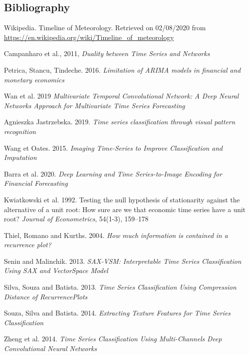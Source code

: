\documentclass[11pt]{article}
\begin{document}
\begin{onehalfspace}
\pagebreak
\section{Bibliography}

\begin{thebibliography}{9}
    Wikipedia. Timeline of Meteorology. Retrieved on 02/08/2020 from \url{https://en.wikipedia.org/wiki/Timeline_of_meteorology}

    Campanharo et al., 2011, \textit{Duality between Time Series and Networks}

    Petrica, Stancu, Tindeche. 2016. \textit{Limitation of ARIMA models in financial and monetary economics}

    Wan et al. 2019 \textit{Multivariate Temporal Convolutional Network: A Deep Neural Networks Approach for Multivariate Time Series Forecasting}

    Agnieszka Jastrzebska. 2019. \textit{Time series classification through visual pattern recognition}

    Wang et Oates. 2015. \textit{Imaging Time-Series to Improve Classification and Imputation}

    Barra et al. 2020. \textit{Deep Learning and Time Series-to-Image Encoding for Financial Forecasting}

    Kwiatkowski et al. 1992. Testing the null hypothesis of stationarity against the alternative of a unit root: How sure are we that economic time series have a unit root? \textit{Journal of Econometrics}, 54(1-3), 159–178

    Thiel, Romano and Kurths. 2004. \textit{How much information is contained in a recurrence plot?}

    Senin and Malinchik. 2013. \textit{SAX-VSM: Interpretable Time Series Classification Using SAX and VectorSpace Model}

    Silva, Souza and Batista. 2013. \textit{ Time  Series  Classification  Using  Compression  Distance  of  RecurrencePlots}

    Souza, Silva and Batista. 2014. \textit{Extracting Texture Features for Time Series Classification}

    Zheng et al. 2014. \textit{Time Series Classification Using Multi-Channels Deep Convolutional Neural Networks}


\end{thebibliography}
\end{onehalfspace}
\end{document}
